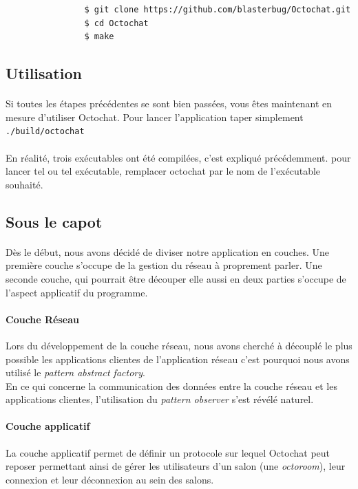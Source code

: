 \documentclass[a4paper]{article}
\begin{document}
			\begin{verbatim}
				$ git clone https://github.com/blasterbug/Octochat.git
				$ cd Octochat
				$ make
			\end{verbatim}

		\subsection{Utilisation}
			\paragraph{}{
			Si toutes les étapes précédentes se sont bien passées, vous êtes maintenant en mesure d'utiliser Octochat.
			Pour lancer l'application taper simplement \verb|./build/octochat|
			}
			\paragraph{}{
			En réalité, trois exécutables ont été compilées, c'est expliqué précédemment. pour lancer tel ou tel exécutable,
			remplacer octochat par le nom de l'exécutable souhaité.
			}

		\subsection{Sous le capot}
			\paragraph{}{
			Dès le début, nous avons décidé de diviser notre application en couches.
			Une première couche s'occupe de la gestion du réseau à proprement parler. Une seconde couche,
			qui pourrait être découper elle aussi en deux parties s'occupe de l'aspect applicatif du programme.
			}

			\paragraph{Couche Réseau}{
			Lors du développement de la couche réseau, nous avons cherché à découplé le plus possible les
			applications clientes de l’application réseau c’est pourquoi nous avons utilisé le \textit{pattern
			abstract factory}. \\
			En ce qui concerne la communication des données entre la couche réseau et les applications clientes,
			l’utilisation du \textit{pattern observer} s’est révélé naturel.
			}

			\paragraph{Couche applicatif}{
			La couche applicatif permet de définir un protocole sur lequel Octochat peut reposer permettant ainsi
			de gérer les utilisateurs d'un salon (une \textit{octoroom}), leur connexion et leur déconnexion au sein
			des salons.
			}
			
\end{document}
